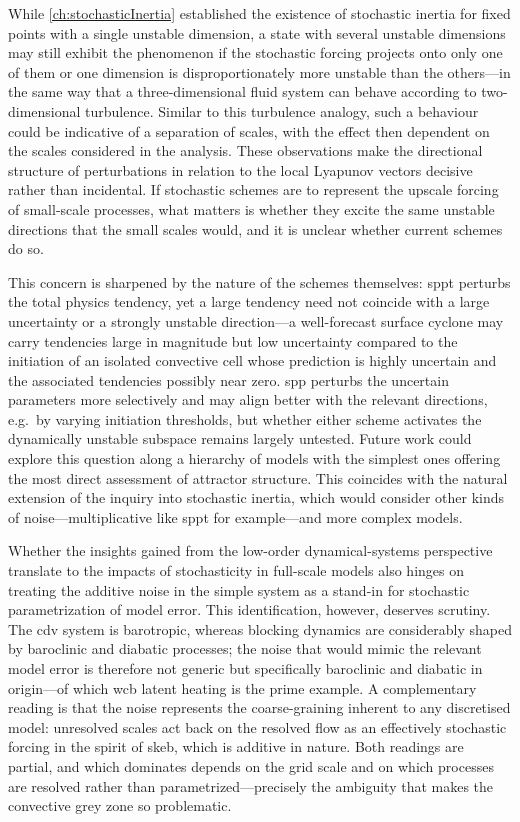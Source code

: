 While \cref{ch:stochasticInertia} established the existence of stochastic
inertia for fixed points with a single unstable dimension,
a state with several unstable dimensions may still exhibit
the phenomenon if the stochastic forcing projects onto only one of
them or one dimension is disproportionately more unstable than the
others---in the same way that a three-dimensional fluid system can behave
according to two-dimensional turbulence. Similar to this turbulence analogy,
such a behaviour could be indicative of a separation of scales, with the effect
then dependent on the scales considered in the analysis.
These observations make the directional structure of perturbations in
relation to the
local Lyapunov vectors decisive rather than
incidental. If stochastic schemes are to represent the upscale forcing of
small-scale processes, what matters is whether they excite the same unstable
directions that the small scales would, and it is unclear whether current
schemes do so.

This concern is sharpened by the nature of the schemes
themselves: \gls{sppt} perturbs the total physics tendency, yet a large
tendency need not coincide with a large uncertainty or a strongly unstable
direction---a well-forecast surface cyclone may carry tendencies large in
magnitude
but low uncertainty compared to the initiation of an isolated convective cell
whose prediction is highly uncertain and the associated tendencies possibly
near zero. \gls{spp} perturbs the uncertain parameters more selectively
and may align better with the relevant directions, e.g.~by varying initiation
thresholds, but whether either
scheme activates the dynamically unstable subspace remains largely untested.
Future work could explore this question along a hierarchy of models with
the simplest ones offering the most direct assessment of attractor structure.
This coincides with the natural extension of the inquiry into stochastic
inertia, which would consider other kinds of noise---multiplicative like
\gls{sppt} for example---and more complex models.

\medskip

Whether the insights gained from the low-order dynamical-systems perspective
translate to the impacts
of stochasticity in full-scale models also hinges on treating the additive
noise in the simple system as a stand-in for
stochastic parametrization of model error. This identification, however,
deserves scrutiny.
The \gls{cdv} system is barotropic, whereas blocking dynamics are considerably
shaped by baroclinic and diabatic processes; the noise that would mimic
the relevant model error is therefore not generic but specifically
baroclinic and diabatic in origin---of which \gls{wcb} latent
heating is the prime example. A complementary
reading is that the noise represents the coarse-graining inherent to any
discretised model: unresolved scales act back on the resolved flow as an
effectively stochastic forcing in the spirit of \gls{skeb}, which is additive
in nature. Both readings are partial, and which
dominates depends on the grid scale and on which processes are resolved
rather than parametrized---precisely the ambiguity that makes the
convective grey zone so problematic.

